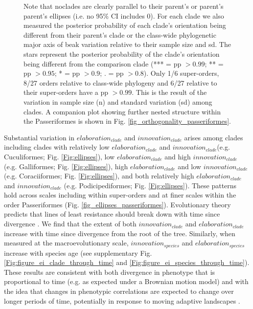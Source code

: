 \documentclass[12pt,letterpaper]{article}
\begin{document}
\begin{figure}[!htbp]
{{Note that noclades are clearly parallel to their parent’s or parent’s parent’s ellipses (i.e.
no 95\% CI includes 0).
For each clade we also measured the posterior probability of each clade's orientation being different from their parent's clade or the class-wide phylogenetic major axis of beak variation relative to their sample size and sd.
The stars represent the posterior probability of the clade's orientation being different from the comparison clade (*** = pp $> 0.99$; ** = pp $>0.95$; * = pp $> 0.9$; . = pp $> 0.8$).
Only 1/6 super-orders, 8/27 orders relative to class-wide phylogeny and 6/27 relative to their super-orders have a pp $> 0.99$.
This is the result of the variation in sample size (n) and standard variation (sd) among clades.
A companion plot showing further nested structure within the Passeriformes is shown in Fig. \ref{fig_orthogonality_passeriformes}.}}
\label{Fig:orthogonality}
\end{figure}
\bigskip



Substantial variation in $elaboration_{clade}$ and $innovation_{clade}$ arises among clades including clades with relatively low $elaboration_{clade}$ and $innovation_{clade}$(e.g. Cuculiformes; Fig. \ref{Fig:ellipses}), low $elaboration_{clade}$ and high $innovation_{clade}$ (e.g. Galliformes; Fig. \ref{Fig:ellipses}), high $elaboration_{clade}$ and low $innovation_{clade}$ (e.g. Coraciiformes; Fig. \ref{Fig:ellipses}), and both relatively high $elaboration_{clade}$ and $innovation_{clade}$ (e.g. Podicipediformes; Fig. \ref{Fig:ellipses}).
These patterns hold across scales including within super-orders and at finer scales within the order Passeriformes (Fig.
\ref{fig_ellipses_passeriformes}).
Evolutionary theory predicts that lines of least resistance should break down with time since divergence \cite{schluter1996adaptive, marroig2005size, mcglothlin2018adaptive}.
We find that the extent of both $innovation_{clade}$ and $elaboration_{clade}$ increase with time since divergence from the root of the tree.
Similarly, when measured at the macroevolutionary scale, $innovation_{species}$ and $elaboration_{species}$ increase with species age (see supplementary Fig. \ref{Fig:figure_ei_clade_through_time} and \ref{Fig:figure_ei_species_through_time}).
These results are consistent with both divergence in phenotype that is proportional to time (e.g. as expected under a Brownian motion model) and with the idea that changes in phenotypic correlations are expected to change over longer periods of time, potentially in response to moving adaptive landscapes \cite{BurinWhales}.
\end{document}
